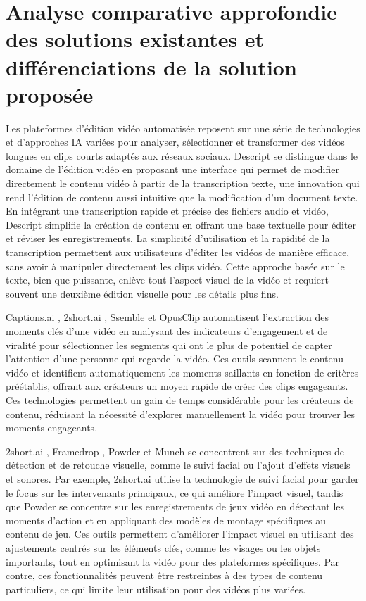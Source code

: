 \section{Analyse comparative approfondie des solutions existantes et différenciations de la solution proposée}


Les plateformes d’édition vidéo automatisée reposent sur une série de technologies et d’approches IA variées pour analyser, sélectionner et transformer des vidéos longues en clips courts adaptés aux réseaux sociaux. Descript \cite{descript2024} se distingue dans le domaine de l’édition vidéo en proposant une interface qui permet de modifier directement le contenu vidéo à partir de la transcription texte, une innovation qui rend l’édition de contenu aussi intuitive que la modification d’un document texte. En intégrant une transcription rapide et précise des fichiers audio et vidéo, Descript simplifie la création de contenu en offrant une base textuelle pour éditer et réviser les enregistrements. La simplicité d’utilisation et la rapidité de la transcription permettent aux utilisateurs d’éditer les vidéos de manière efficace, sans avoir à manipuler directement les clips vidéo. Cette approche basée sur le texte, bien que puissante, enlève tout l’aspect visuel de la vidéo et requiert souvent une deuxième édition visuelle pour les détails plus fins.

Captions.ai \cite{captions2024}, 2short.ai \cite{short2024}, Ssemble \cite{ssemble2024} et OpusClip \cite{opusclip2024} automatisent l’extraction des moments clés d’une vidéo en analysant des indicateurs d’engagement et de viralité pour sélectionner les segments qui ont le plus de potentiel de capter l’attention d’une personne qui regarde la vidéo. Ces outils scannent le contenu vidéo et identifient automatiquement les moments saillants en fonction de critères préétablis, offrant aux créateurs un moyen rapide de créer des clips engageants. Ces technologies permettent un gain de temps considérable pour les créateurs de contenu, réduisant la nécessité d’explorer manuellement la vidéo pour trouver les moments engageants.

2short.ai \cite{short2024}, Framedrop \cite{framedrop2024}, Powder \cite{powder2024} et Munch \cite{munch2024} se concentrent sur des techniques de détection et de retouche visuelle, comme le suivi facial ou l’ajout d’effets visuels et sonores. Par exemple, 2short.ai utilise la technologie de suivi facial pour garder le focus sur les intervenants principaux, ce qui améliore l’impact visuel, tandis que Powder \cite{powder2024} se concentre sur les enregistrements de jeux vidéo en détectant les moments d’action et en appliquant des modèles de montage spécifiques au contenu de jeu. Ces outils permettent d’améliorer l’impact visuel en utilisant des ajustements centrés sur les éléments clés, comme les visages ou les objets importants, tout en optimisant la vidéo pour des plateformes spécifiques. Par contre, ces fonctionnalités peuvent être restreintes à des types de contenu particuliers, ce qui limite leur utilisation pour des vidéos plus variées.

